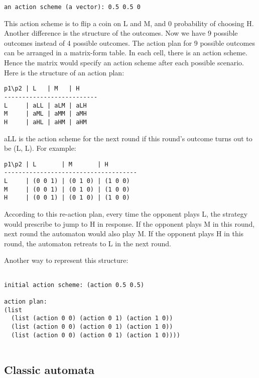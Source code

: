\documentclass[12.5pt]{report}
\begin{document}
\begin{verbatim}
an action scheme (a vector): 0.5 0.5 0
\end{verbatim}

This action scheme is to flip a coin on L and M, and 0 probability of choosing H.\\

Another difference is the structure of the outcomes. Now we have 9 possible outcomes instead of 4 possible outcomes. The action plan for 9 possible outcomes can be arranged in a matrix-form table. In each cell, there is an action scheme. Hence the matrix would specify an action scheme after each possible scenario. Here is the structure of an action plan:

\begin{verbatim}
p1\p2 | L   | M   | H
--------------------------
L     | aLL | aLM | aLH
M     | aML | aMM | aMH
H     | aHL | aHM | aHM

\end{verbatim}

aLL is the action scheme for the next round if this round's outcome turns out to be (L, L). For example:

\begin{verbatim}
p1\p2 | L       | M       | H
-------------------------------------
L     | (0 0 1) | (0 1 0) | (1 0 0)
M     | (0 0 1) | (0 1 0) | (1 0 0)
H     | (0 0 1) | (0 1 0) | (1 0 0)

\end{verbatim}


According to this re-action plan, every time the opponent plays L, the strategy would prescribe to jump to H in response. If the opponent plays M in this round, next round the automaton would also play M. If the opponent plays H in this round, the automaton retreats to L in the next round.

Another way to represent this structure:
\begin{verbatim}

initial action scheme: (action 0.5 0.5)

action plan:
(list
  (list (action 0 0) (action 0 1) (action 1 0))
  (list (action 0 0) (action 0 1) (action 1 0))
  (list (action 0 0) (action 0 1) (action 1 0))))


\end{verbatim}

\subsection{Classic automata}
\end{document}
